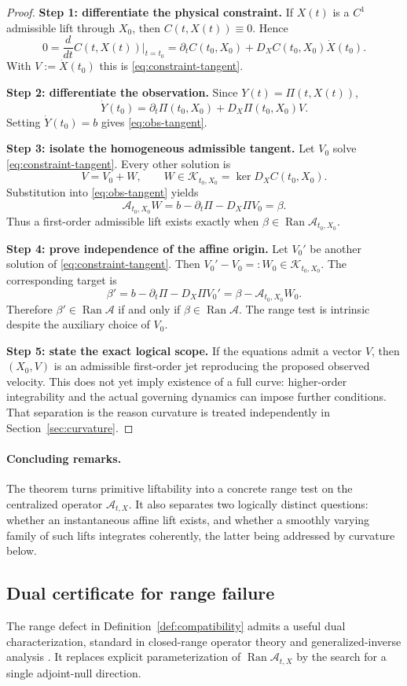 \documentclass[12pt]{article}
\newcommand{\Ran}{\operatorname{Ran}}
\newcommand{\Kt}{\mathcal K}
\newcommand{\Comp}{\mathscr A}
\begin{document}
\begin{proof}
\textbf{Step 1: differentiate the physical constraint.}
If $X(t)$ is a $C^1$ admissible lift through $X_0$, then $C(t,X(t))\equiv0$. Hence
\[
0=\frac{d}{dt}C(t,X(t))\big|_{t=t_0}
=\partial_tC(t_0,X_0)+D_XC(t_0,X_0)\dot X(t_0).
\]
With $V:=\dot X(t_0)$ this is \eqref{eq:constraint-tangent}.

\textbf{Step 2: differentiate the observation.}
Since $Y(t)=\Pi(t,X(t))$,
\[
\dot Y(t_0)
=\partial_t\Pi(t_0,X_0)+D_X\Pi(t_0,X_0)V.
\]
Setting $\dot Y(t_0)=b$ gives \eqref{eq:obs-tangent}.

\textbf{Step 3: isolate the homogeneous admissible tangent.}
Let $V_0$ solve \eqref{eq:constraint-tangent}. Every other solution is
\[
V=V_0+W,
\qquad W\in\Kt_{t_0,X_0}=\ker D_XC(t_0,X_0).
\]
Substitution into \eqref{eq:obs-tangent} yields
\[
\Comp_{t_0,X_0}W
=b-\partial_t\Pi-D_X\Pi V_0
=\beta.
\]
Thus a first-order admissible lift exists exactly when $\beta\in\Ran\Comp_{t_0,X_0}$.

\textbf{Step 4: prove independence of the affine origin.}
Let $V_0'$ be another solution of \eqref{eq:constraint-tangent}. Then $V_0'-V_0=:W_0\in\Kt_{t_0,X_0}$. The corresponding target is
\[
\beta'
=b-\partial_t\Pi-D_X\Pi V_0'
=\beta-\Comp_{t_0,X_0}W_0.
\]
Therefore $\beta'\in\Ran\Comp$ if and only if $\beta\in\Ran\Comp$. The range test is intrinsic despite the auxiliary choice of $V_0$.

\textbf{Step 5: state the exact logical scope.}
If the equations admit a vector $V$, then $(X_0,V)$ is an admissible first-order jet reproducing the proposed observed velocity. This does not yet imply existence of a full curve: higher-order integrability and the actual governing dynamics can impose further conditions. That separation is the reason curvature is treated independently in Section~\ref{sec:curvature}.
\end{proof}

\paragraph{Concluding remarks.}
The theorem turns primitive liftability into a concrete range test on the centralized operator $\Comp_{t,X}$. It also separates two logically distinct questions: whether an instantaneous affine lift exists, and whether a smoothly varying family of such lifts integrates coherently, the latter being addressed by curvature below.

\subsection{Dual certificate for range failure}
The range defect in Definition~\ref{def:compatibility} admits a useful dual characterization, standard in closed-range operator theory and generalized-inverse analysis \cite{BenIsraelGreville}. It replaces explicit parameterization of $\Ran\Comp_{t,X}$ by the search for a single adjoint-null direction.
\end{document}
